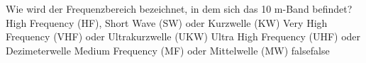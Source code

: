     {Wie wird der Frequenzbereich bezeichnet, in dem sich das 10 m-Band befindet?}
    {High Frequency (HF), Short Wave (SW) oder Kurzwelle (KW)}
    {Very High Frequency (VHF) oder Ultrakurzwelle (UKW)}
    {Ultra High Frequency (UHF) oder Dezimeterwelle}
    {Medium Frequency (MF) oder Mittelwelle (MW)}
    {false}{false}